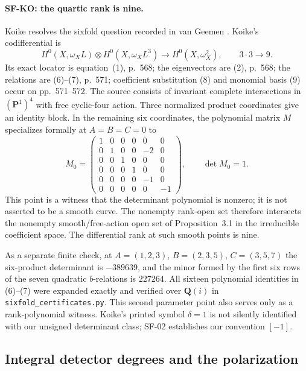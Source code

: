 \paragraph{SF-KO: the quartic rank is nine.}
Koike \cite[Theorem~2.1 and Proposition~3.1]{SF-Koike2004} resolves the
sixfold question recorded in van Geemen
\cite[Remark~5.4, p.~630]{SF-vanGeemen1996}. Koike's codifferential is
\[
 H^0(X,\omega_XL)\otimes H^0(X,\omega_XL^3)
 \longrightarrow H^0(X,\omega_X^2),\qquad 3\cdot3\longrightarrow9.
\]
Its exact locator is equation~(1), p.~568; the eigenvectors are (2),
p.~568; the relations are (6)--(7), p.~571; coefficient substitution
(8) and monomial basis (9) occur on pp.~571--572. The source consists
of invariant complete intersections in $(\mathbf P^1)^4$ with free
cyclic-four action. Three normalized product coordinates give an
identity block. In the remaining six coordinates, the polynomial
matrix $M$ specializes formally at $A=B=C=0$ to
\[
 M_0=\begin{pmatrix}
 1&0&0&0&0&0\\
 0&1&0&0&-2&0\\
 0&0&1&0&0&0\\
 0&0&0&1&0&0\\
 0&0&0&0&-1&0\\
 0&0&0&0&0&-1
 \end{pmatrix},\qquad \det M_0=1.
\]
This point is a witness that the determinant polynomial is nonzero;
it is not asserted to be a smooth curve. The nonempty rank-open set
therefore intersects the nonempty smooth/free-action open set of
Proposition~3.1 in the irreducible coefficient space. The differential
rank at such smooth points is nine.

As a separate finite check, at $A=(1,2,3)$, $B=(2,3,5)$,
$C=(3,5,7)$ the six-product determinant is $-389639$, and the minor
formed by the first six rows of the seven quadratic $b$-relations is
$227264$. All sixteen polynomial identities in (6)--(7) were expanded
exactly and verified over $\mathbf Q(i)$ in
\texttt{sixfold\_certificates.py}. This second parameter point also
serves only as a rank-polynomial witness. Koike's printed symbol
$\delta=1$ is not silently identified with our unsigned determinant
class; SF-02 establishes our convention $[-1]$.

\subsection{Integral detector degrees and the polarization}

